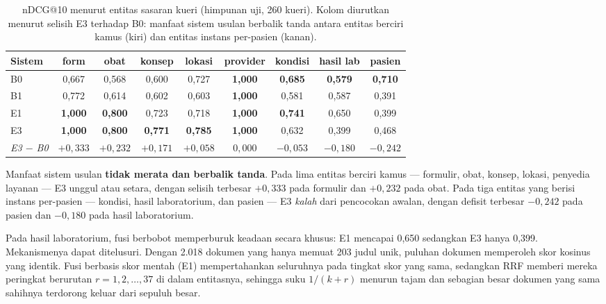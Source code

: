 \documentclass[journal,twoside,web]{ieeecolor}
\begin{document}
\begin{table}[!t]
\caption{nDCG@10 menurut entitas sasaran kueri (himpunan uji, 260 kueri).
Kolom diurutkan menurut selisih E3 terhadap B0: manfaat sistem usulan
berbalik tanda antara entitas berciri kamus (kiri) dan entitas instans
per-pasien (kanan).}
\label{tab:entitas}
\centering
\footnotesize
\setlength{\tabcolsep}{11pt}
\begin{tabular}{@{}lcccccccc@{}}
\toprule
\textbf{Sistem} & \textbf{form} & \textbf{obat} & \textbf{konsep} &
\textbf{lokasi} & \textbf{provider} & \textbf{kondisi} &
\textbf{hasil lab} & \textbf{pasien} \\
\midrule
B0 & 0,667 & 0,568 & 0,600 & 0,727 & \textbf{1,000} & \textbf{0,685} & \textbf{0,579} & \textbf{0,710} \\
B1 & 0,772 & 0,614 & 0,602 & 0,603 & \textbf{1,000} & 0,581 & 0,587 & 0,391 \\
E1 & \textbf{1,000} & \textbf{0,800} & 0,723 & 0,718 & \textbf{1,000} & \textbf{0,741} & 0,650 & 0,399 \\
E3 & \textbf{1,000} & \textbf{0,800} & \textbf{0,771} & \textbf{0,785} & \textbf{1,000} & 0,632 & 0,399 & 0,468 \\
\midrule
\emph{E3 $-$ B0} & $+0{,}333$ & $+0{,}232$ & $+0{,}171$ & $+0{,}058$ & $0{,}000$ & $-0{,}053$ & $-0{,}180$ & $-0{,}242$ \\
\bottomrule
\end{tabular}
\end{table}

Manfaat sistem usulan \textbf{tidak merata dan berbalik tanda}. Pada lima entitas
berciri kamus --- formulir, obat, konsep, lokasi, penyedia layanan --- E3 unggul
atau setara, dengan selisih terbesar $+0{,}333$ pada formulir dan $+0{,}232$ pada
obat. Pada tiga entitas yang berisi instans per-pasien --- kondisi, hasil
laboratorium, dan pasien --- E3 \emph{kalah} dari pencocokan awalan, dengan
defisit terbesar $-0{,}242$ pada pasien dan $-0{,}180$ pada hasil laboratorium.

Pada hasil laboratorium, fusi berbobot memperburuk keadaan secara khusus: E1
mencapai 0,650 sedangkan E3 hanya 0,399. Mekanismenya dapat ditelusuri. Dengan
2.018 dokumen yang hanya memuat 203 judul unik, puluhan dokumen memperoleh skor
kosinus yang identik. Fusi berbasis skor mentah (E1) mempertahankan seluruhnya
pada tingkat skor yang sama, sedangkan RRF memberi mereka peringkat berurutan
$r = 1, 2, \dots, 37$ di dalam entitasnya, sehingga suku $1/(k+r)$ menurun tajam
dan sebagian besar dokumen yang sama sahihnya terdorong keluar dari sepuluh
besar.
\end{document}

